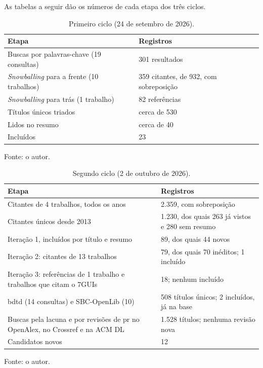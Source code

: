 As tabelas a seguir dão os números de cada etapa dos três ciclos.

\begin{table}[htbp]
\centering
\caption{\label{tab:revisaoRodada1}Primeiro ciclo (24 de setembro de 2026).}
\small
\begin{tabular}{p{}p{}}
\hline
Etapa & Registros \\
\hline
Buscas por palavras-chave (19 consultas) & 301 resultados \\
\textit{Snowballing} para a frente (10 trabalhos) & 359 citantes, de 932, com sobreposição \\
\textit{Snowballing} para trás (1 trabalho) & 82 referências \\
Títulos únicos triados & cerca de 530 \\
Lidos no resumo & cerca de 40 \\
Incluídos & 23 \\
\hline
\end{tabular}

Fonte: o autor.
\end{table}

\begin{table}[htbp]
\centering
\caption{\label{tab:revisaoRodada2}Segundo ciclo (2 de outubro de 2026).}
\small
\begin{tabular}{p{}p{}}
\hline
Etapa & Registros \\
\hline
Citantes de 4 trabalhos, todos os anos & 2.359, com sobreposição \\
Citantes únicos desde 2013 & 1.230, dos quais 263 já vistos e 280 sem resumo \\
Iteração 1, incluídos por título e resumo & 89, dos quais 44 novos \\
Iteração 2: citantes de 13 trabalhos & 79, dos quais 70 inéditos; 1 incluído \\
Iteração 3: referências de 1 trabalho e trabalhos que citam o 7GUIs & 18; nenhum incluído \\
\gls{bdtd} (14 consultas) e SBC-OpenLib (10) & 508 títulos únicos; 2 incluídos, já na base \\
Buscas pela lacuna e por revisões de \gls{pr} no OpenAlex, no Crossref e na ACM DL & 1.528 títulos; nenhuma revisão nova \\
Candidatos novos & 12 \\
\hline
\end{tabular}

Fonte: o autor.
\end{table}

